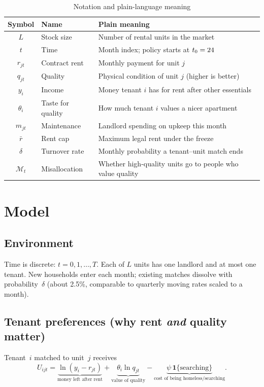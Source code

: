 \documentclass[11pt,a4paper]{article}
\begin{document}
\begin{table}[htbp]
\centering
\caption{Notation and plain-language meaning}
\label{tab:notation}
\small
\begin{tabular}{clp{7.5cm}}
\toprule
Symbol & Name & Plain meaning \\
\midrule
$L$ & Stock size & Number of rental units in the market \\
$t$ & Time & Month index; policy starts at $t_0=24$ \\
$r_{jt}$ & Contract rent & Monthly payment for unit $j$ \\
$q_{jt}$ & Quality & Physical condition of unit $j$ (higher is better) \\
$y_i$ & Income & Money tenant $i$ has for rent after other essentials \\
$\theta_i$ & Taste for quality & How much tenant $i$ values a nicer apartment \\
$m_{jt}$ & Maintenance & Landlord spending on upkeep this month \\
$\bar r$ & Rent cap & Maximum legal rent under the freeze \\
$\delta$ & Turnover rate & Monthly probability a tenant--unit match ends \\
$\mathcal{M}_t$ & Misallocation & Whether high-quality units go to people who value quality \\
\bottomrule
\end{tabular}
\end{table}

\section{Model}

\subsection{Environment}

Time is discrete: $t=0,1,\ldots,T$. Each of $L$ units has one landlord and at most one tenant. New households enter each month; existing matches dissolve with probability~$\delta$ (about 2.5\%, comparable to quarterly moving rates scaled to a month).

\subsection{Tenant preferences (why rent \emph{and} quality matter)}

Tenant~$i$ matched to unit~$j$ receives
\begin{equation}
    U_{ijt}=\underbrace{\ln(y_i-r_{jt})}_{\text{money left after rent}}
    +\underbrace{\theta_i\ln q_{jt}}_{\text{value of quality}}
    -\underbrace{\psi\,\mathbf{1}\{\text{searching}\}}_{\text{cost of being homeless/searching}}.
    \label{eq:utility}
\end{equation}
\end{document}
